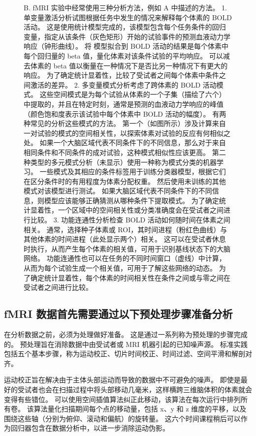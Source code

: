 \begin{figure}[htbp]
{		B. fMRI 实验中经常使用三种分析方法，例如 A 中描述的方法。
		1. 单变量激活分析试图根据任务中发生的情况来解释每个体素的 BOLD 活动。 
		这是使用统计模型完成的，该模型包含每个任务条件的回归变量，指定从该条件（灰色矩形）开始的试验事件的预测血液动力学响应（钟形曲线）。 将
		模型拟合到 BOLD 活动的结果是每个体素中每个回归量的 beta 值，量化体素对该条件试验的平均响应。 
		可以减去体素的 beta 值以衡量在一种情况下是否比另一种情况下有更大的响应。 
		为了确定统计显着性，比较了受试者之间每个体素中条件之间激活的差异。 
		2. 多变量模式分析考虑了跨体素的 BOLD 活动模式。 
		这些空间模式是为每个试验从体素的一个子集（描绘了六个）中提取的，并且在特定时刻，通常是预测的血液动力学响应的峰值（颜色饱和度表示该试验中每个体素中 BOLD 活动的幅度）。 有两种常见的分析这些模式的方法。 
		第一个（如图所示）涉及计算来自一对试验的模式的空间相关性，以探索体素对试验的反应有何相似之处。 
		如果一个大脑区域代表不同条件下的不同信息，那么对于来自相同条件和不同条件的成对试验，这种模式相似性应该更高。 
		第二种类型的多元模式分析（未显示）使用一种称为模式分类的机器学习。 
		一些模式及其相应的条件标签用于训练分类器模型，根据它们在区分条件时的有用程度为体素分配权重。 
		然后使用未训练的其他模式对该模型进行测试。 
		如果大脑区域代表不同条件下的不同信息，则模型应该能够正确猜测从哪种条件下提取模式。 
		为了确定统计显着性，一个区域中的空间相关性或分类准确度会在受试者之间进行比较。 
		3. 功能连通性分析检查 BOLD 活动如何随时间在体素之间相关。 
		通常，选择种子体素或 ROI，其时间进程（粉红色曲线）与其他体素的时间进程（此处显示两个）相关。 
		这可以在受试者休息时执行，从而产生每个体素的相关值，可用于识别基线状态下的大脑网络。 
		功能连通性也可以在任务的不同时间窗口（虚线）中计算，从而为每个试验生成一个相关值，可用于了解这些网络的动态。 
		为了确定统计显着性，每个体素的时间相关性在条件之间或与零之间在受试者之间进行比较。}
	\label{fig:6_2}
\end{figure}


\subsection{fMRI 数据首先需要通过以下预处理步骤准备分析}
在分析数据之前，必须为处理做好准备。 
这是通过一系列称为预处理的步骤完成的。 
预处理旨在消除数据中由受试者或 MRI 机器引起的已知噪声源。 
标准实践包括五个基本步骤，称为运动校正、切片时间校正、时间过滤、空间平滑和解剖对齐。

运动校正旨在解决由于主体头部运动而导致的数据中不可避免的噪声。 
即使是最好的受试者也会在扫描过程中将头部移动几毫米，这样横跨三维脑体积的体素就会变得有些错位。 
可以使用空间插值算法纠正此移动，该算法在每次运行中排列所有卷。 
该算法量化扫描期间每个点的移动量，包括 x、y 和 z 维度的平移，以及围绕这些轴（分别为俯仰、滚动和偏航）的旋转量。 
这六个时间课程稍后可以作为回归器包含在数据分析中，以进一步消除运动伪影。


